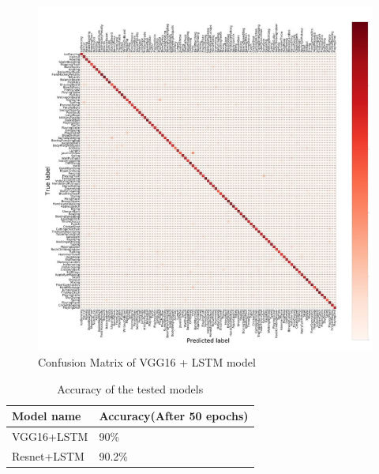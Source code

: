 \begin{center}
	\begin{figure}[H]
		\centering
		\includegraphics[width=1\columnwidth]{images/chap3/cfm-2.jpg}
		\caption{Confusion Matrix of VGG16 + LSTM model}
		\label{chap3:cfm-zoom}
	\end{figure}
\end{center}
\vspace{-1cm}

\begin{table}[H]
	\begin{tabular}{|P{5cm}|L{5cm}|}
		\hline
		\textbf{Model name}			&  \textbf{Accuracy}(After 50 epochs)
		\\ \hline
		VGG16+LSTM	 	&   90\%  
		\\ \hline
		Resnet+LSTM 	&  	90.2\%       
		\\ \hline
	\end{tabular}
\caption{Accuracy of the tested models}
\end{table}



